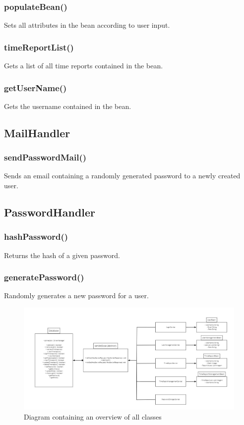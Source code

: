 \documentclass{article}
\begin{document}
\subsubsection{populateBean()}
Sets all attributes in the bean according to user input.
\subsubsection{timeReportList()}
Gets a list of all time reports contained in the bean.
\subsubsection{getUserName()}
Gets the username contained in the bean.

\subsection{MailHandler}
\subsubsection{sendPasswordMail()}
Sends an email containing a randomly generated password to a newly created user.
\subsection{PasswordHandler}
\subsubsection{hashPassword()}
Returns the hash of a given password.
\subsubsection{generatePassword()}
Randomly generates a new password for a user.


\begin{figure}[H]
    \centering
    \includegraphics[scale=0.5]{images/classDiagram.png}
    \caption{Diagram containing an overview of all classes}
    \label{fig:classDiagram}
\end{figure}
\end{document}
